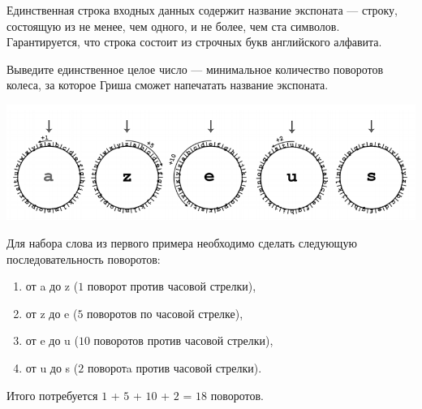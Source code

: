 \begin{problem}
\InputFile

Единственная строка входных данных содержит название экспоната — строку, состоящую из не менее, чем одного, и не более, чем ста символов. Гарантируется, что строка состоит из строчных букв английского алфавита.

\OutputFile

Выведите единственное целое число — минимальное количество поворотов колеса, за которое Гриша сможет напечатать название экспоната.

\Examples

\begin{example}
%
%
%
\end{example}

\Explanation

\begin{center}
\begin{adjustbox}{max size={\textwidth}{\textheight}}
\includegraphics{images/2963.png}
\end{adjustbox}
\end{center}

Для набора слова из первого примера необходимо сделать следующую последовательность поворотов:

\begin{enumerate}
    \item от a до z ($1$ поворот против часовой стрелки),
    \item от z до e ($5$ поворотов по часовой стрелке),
    \item от e до u ($10$ поворотов против часовой стрелки),
    \item от u до s ($2$ поворотa против часовой стрелки).
\end{enumerate}

Итого потребуется $1$ + $5$ + $10$ + $2$ = $18$ поворотов.

\end{problem}
